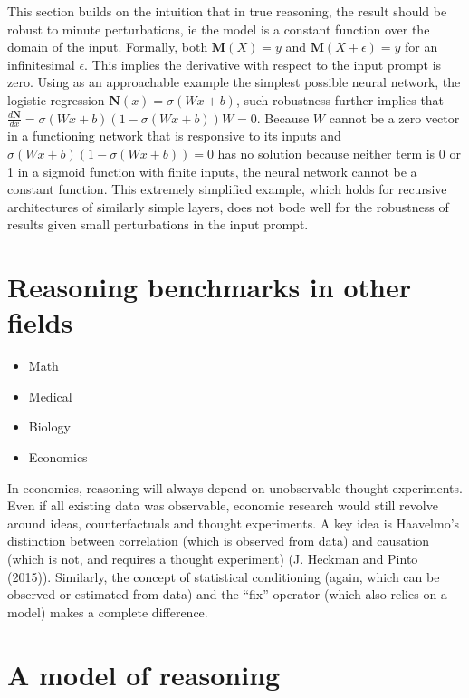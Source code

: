 \documentclass[
]{article}
\begin{document}
This section builds on the intuition that in true reasoning, the result
should be robust to minute perturbations, ie the model is a constant
function over the domain of the input. Formally, both
\(\mathbf{M}(X) = y\) and \(\mathbf{M}(X + \epsilon) = y\) for an
infinitesimal \(\epsilon\). This implies the derivative with respect to
the input prompt is zero. Using as an approachable example the simplest
possible neural network, the logistic regression
\(\mathbf{N}(x) = \sigma(Wx + b)\), such robustness further implies that
\(\frac{d\mathbf{N}}{d x} = \sigma(Wx + b)(1-\sigma(Wx + b))W = 0\).
Because \(W\) cannot be a zero vector in a functioning network that is
responsive to its inputs and \(\sigma(Wx + b)(1-\sigma(Wx + b)) = 0\)
has no solution because neither term is 0 or 1 in a sigmoid function
with finite inputs, the neural network cannot be a constant function.
This extremely simplified example, which holds for recursive
architectures of similarly simple layers, does not bode well for the
robustness of results given small perturbations in the input prompt.

\section{Reasoning benchmarks in other
fields}\label{reasoning-benchmarks-in-other-fields}

\begin{itemize}
\item
  Math
\item
  Medical
\item
  Biology
\item
  Economics
\end{itemize}

In economics, reasoning will always depend on unobservable thought
experiments. Even if all existing data was observable, economic research
would still revolve around ideas, counterfactuals and thought
experiments. A key idea is Haavelmo's distinction between correlation
(which is observed from data) and causation (which is not, and requires
a thought experiment) (J. Heckman and Pinto (2015)). Similarly, the
concept of statistical conditioning (again, which can be observed or
estimated from data) and the ``fix'' operator (which also relies on a
model) makes a complete difference.

\section{A model of reasoning}\label{a-model-of-reasoning}
\end{document}
